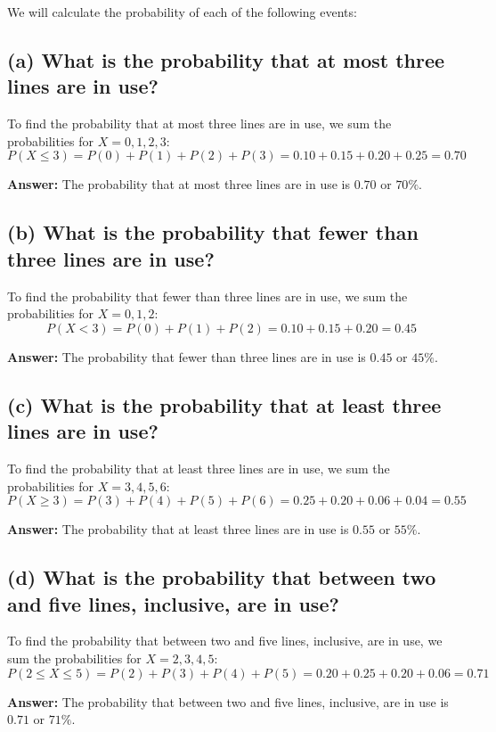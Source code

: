 \documentclass{article}
\begin{document}
We will calculate the probability of each of the following events:

\subsection*{(a) What is the probability that at most three lines are in use?}

To find the probability that at most three lines are in use, we sum the probabilities for \(X = 0, 1, 2, 3\):
\[
P(X \leq 3) = P(0) + P(1) + P(2) + P(3) = 0.10 + 0.15 + 0.20 + 0.25 = 0.70
\]

\textbf{Answer:} The probability that at most three lines are in use is \(0.70\) or \(70\%\).

\subsection*{(b) What is the probability that fewer than three lines are in use?}

To find the probability that fewer than three lines are in use, we sum the probabilities for \(X = 0, 1, 2\):
\[
P(X < 3) = P(0) + P(1) + P(2) = 0.10 + 0.15 + 0.20 = 0.45
\]

\textbf{Answer:} The probability that fewer than three lines are in use is \(0.45\) or \(45\%\).

\subsection*{(c) What is the probability that at least three lines are in use?}

To find the probability that at least three lines are in use, we sum the probabilities for \(X = 3, 4, 5, 6\):
\[
P(X \geq 3) = P(3) + P(4) + P(5) + P(6) = 0.25 + 0.20 + 0.06 + 0.04 = 0.55
\]

\textbf{Answer:} The probability that at least three lines are in use is \(0.55\) or \(55\%\).

\subsection*{(d) What is the probability that between two and five lines, inclusive, are in use?}

To find the probability that between two and five lines, inclusive, are in use, we sum the probabilities for \(X = 2, 3, 4, 5\):
\[
P(2 \leq X \leq 5) = P(2) + P(3) + P(4) + P(5) = 0.20 + 0.25 + 0.20 + 0.06 = 0.71
\]

\textbf{Answer:} The probability that between two and five lines, inclusive, are in use is \(0.71\) or \(71\%\).
\end{document}
